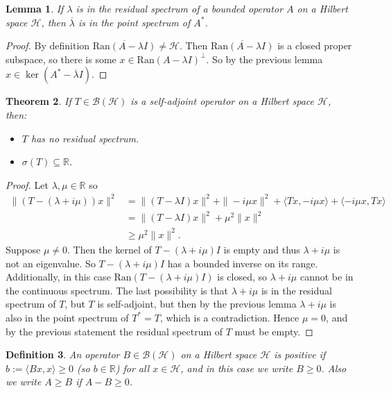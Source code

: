 \documentclass[12pt,oneside]{report}
\newtheorem{thm}{Theorem}[chapter]
\newtheorem{lem}[thm]{Lemma}
\newtheorem{defn}[thm]{Definition}
\begin{document}
\begin{lem}
    If $\lambda$ is in the residual spectrum of a bounded operator $A$ on a Hilbert space $\mathscr{H}$, then $\overline{\lambda}$ is in the point spectrum of $A^{*}$.
\end{lem}
\begin{proof}
    By definition $\overline{\text{Ran}(A - \lambda I)} \neq \mathscr{H}$. Then $\overline{\text{Ran}(A - \lambda I)}$ is a closed proper subspace, so there is some $x \in \text{Ran}(A - \lambda I)^{\perp}$. So by the previous lemma $x \in \ker(A^{*} - \overline{\lambda} I)$.
\end{proof}

\begin{thm}
    If $T \in \mathscr{B}(\mathscr{H})$ is a self-adjoint operator on a Hilbert space $\mathscr{H}$, then:
    \begin{itemize}
        \item[a)] $T$ has no residual spectrum.
        \item[b)] $\sigma(T) \subseteq \mathbb{R}$.
    \end{itemize}
\end{thm}
\begin{proof}
    Let $\lambda, \mu \in \mathbb{R}$ so 
    \begin{align}
        \|(T - (\lambda + i \mu))x\|^{2} &= \|(T - \lambda I)x\|^{2} + \|-i \mu x\|^{2} + \langle Tx, -i \mu x \rangle +            \langle -i \mu x, Tx \rangle \\
        &= \|(T - \lambda I)x\|^{2} +\mu^{2}\|x\|^{2} \\
        &\geq \mu^{2}\|x\|^{2}.
    \end{align}
    Suppose $\mu \neq 0$. Then the kernel of $T - (\lambda + i \mu)I$ is empty and thus $\lambda + i \mu$ is not an eigenvalue. So $T - (\lambda + i \mu)I$ has a bounded inverse on its range. Additionally, in this case $\text{Ran}(T - (\lambda + i \mu)I)$ is closed, so $\lambda + i \mu$ cannot be in the continuous spectrum. The last possibility is that $\lambda + i \mu$ is in the residual spectrum of $T$, but $T$ is self-adjoint, but then by the previous lemma $\lambda + i \mu$ is also in the point spectrum of $T^{*} = T$, which is a contradiction. Hence $\mu = 0$, and by the previous statement the residual spectrum of $T$ must be empty.
\end{proof}

\begin{defn}
    An operator $B \in \mathscr{B}(\mathscr{H})$ on a Hilbert space $\mathscr{H}$ is positive if $b := \langle Bx, x \rangle \geq 0$ (so $b \in \mathbb{R}$) for all $x \in \mathscr{H}$, and in this case we write $B \geq 0$. Also we write $A \geq B$ if $A - B \geq 0$.
\end{defn}
\end{document}
